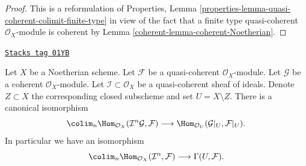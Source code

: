 \begin{proof}

This is a reformulation of Properties, Lemma
\ref{properties-lemma-quasi-coherent-colimit-finite-type}
in view of the fact that a finite type quasi-coherent
$\mathcal{O}_X$-module is coherent by
Lemma \ref{coherent-lemma-coherent-Noetherian}.
\end{proof}

\begin{lemma}
\label{coherent-lemma-homs-over-open}
\href{https://stacks.math.columbia.edu/tag/01YB}{\texttt{Stacks tag 01YB}}

Let $X$ be a Noetherian scheme.
Let $\mathcal{F}$ be a quasi-coherent $\mathcal{O}_X$-module.
Let $\mathcal{G}$ be a coherent $\mathcal{O}_X$-module.
Let $\mathcal{I} \subset \mathcal{O}_X$ be a quasi-coherent sheaf of
ideals. Denote $Z \subset X$ the corresponding closed subscheme and
set $U = X \setminus Z$.
There is a canonical isomorphism
$$
\colim_n \Hom_{\mathcal{O}_X}(\mathcal{I}^n\mathcal{G}, \mathcal{F})
\longrightarrow
\Hom_{\mathcal{O}_U}(\mathcal{G}|_U, \mathcal{F}|_U).
$$
In particular we have an isomorphism
$$
\colim_n \Hom_{\mathcal{O}_X}(
\mathcal{I}^n, \mathcal{F})
\longrightarrow
\Gamma(U, \mathcal{F}).
$$
\end{lemma}

